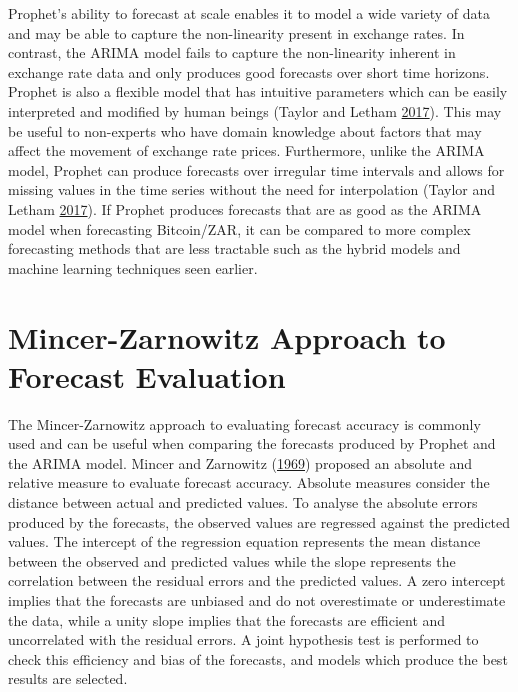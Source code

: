 \documentclass[12pt,preprint, authoryear]{elsarticle}
\numberwithin{equation}{section}
\numberwithin{figure}{section}
\numberwithin{table}{section}
\begin{document}
Prophet's ability to forecast at scale enables it to model a wide
variety of data and may be able to capture the non-linearity present in
exchange rates. In contrast, the ARIMA model fails to capture the
non-linearity inherent in exchange rate data and only produces good
forecasts over short time horizons. Prophet is also a flexible model
that has intuitive parameters which can be easily interpreted and
modified by human beings (Taylor and Letham
\protect\hyperlink{ref-taylor2017}{2017}). This may be useful to
non-experts who have domain knowledge about factors that may affect the
movement of exchange rate prices. Furthermore, unlike the ARIMA model,
Prophet can produce forecasts over irregular time intervals and allows
for missing values in the time series without the need for interpolation
(Taylor and Letham \protect\hyperlink{ref-taylor2017}{2017}). If Prophet
produces forecasts that are as good as the ARIMA model when forecasting
Bitcoin/ZAR, it can be compared to more complex forecasting methods that
are less tractable such as the hybrid models and machine learning
techniques seen earlier.

\section{Mincer-Zarnowitz Approach to Forecast
Evaluation}\label{mincer-zarnowitz-approach-to-forecast-evaluation}

The Mincer-Zarnowitz approach to evaluating forecast accuracy is
commonly used and can be useful when comparing the forecasts produced by
Prophet and the ARIMA model. Mincer and Zarnowitz
(\protect\hyperlink{ref-mincer1969}{1969}) proposed an absolute and
relative measure to evaluate forecast accuracy. Absolute measures
consider the distance between actual and predicted values. To analyse
the absolute errors produced by the forecasts, the observed values are
regressed against the predicted values. The intercept of the regression
equation represents the mean distance between the observed and predicted
values while the slope represents the correlation between the residual
errors and the predicted values. A zero intercept implies that the
forecasts are unbiased and do not overestimate or underestimate the
data, while a unity slope implies that the forecasts are efficient and
uncorrelated with the residual errors. A joint hypothesis test is
performed to check this efficiency and bias of the forecasts, and models
which produce the best results are selected.
\end{document}
